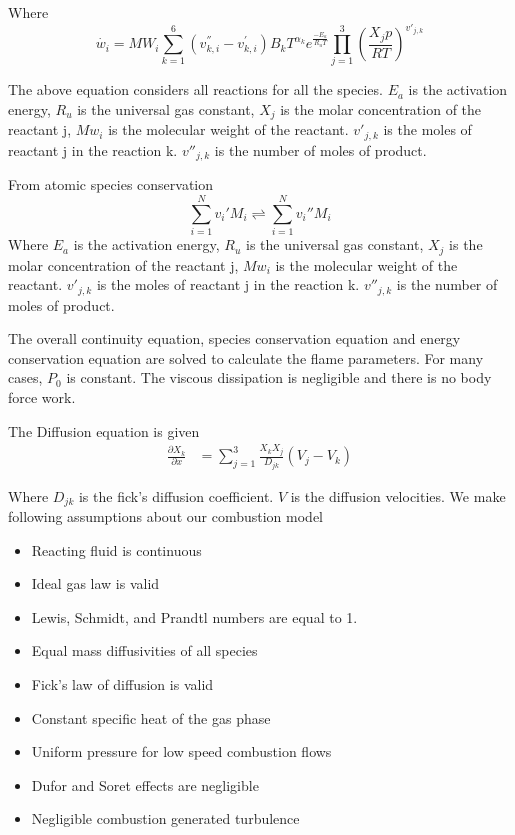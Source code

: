 Where $$\dot{w_i} = MW_i \sum_{k=1}^{6}(v_{k,i}^{''} - v_{k,i}^{'}) B_k T^{\alpha_k} e^{\frac{-E_a}{R_u T}} \prod_{j=1}^3 \left(\frac{X_j p}{R T} \right)^{v'_{j,k}}$$

\noindent The above equation considers all reactions for all the species. $E_a$ is the activation energy, $R_u$ is the universal gas constant, $X_j$ is the molar concentration of the reactant j, $Mw_i$ is the molecular weight of the reactant. $v'_{j,k}$ is the moles of reactant j in the reaction k. $v''_{j,k}$ is the number of moles of product. 

\noindent From atomic species conservation 
	$$\sum_{i=1}^{N} v_i{'}M_i \rightleftharpoons \sum_{i=1}^{N} v_i{''}M_i $$
\noindent Where $E_a$ is the activation energy, $R_u$ is the universal gas constant, $X_j$ is the molar concentration of the reactant j, $Mw_i$ is the molecular weight of the reactant. $v'_{j,k}$ is the moles of reactant j in the reaction k. $v''_{j,k}$ is the number of moles of product. 

\bigskip

\noindent The overall continuity equation, species conservation equation and energy conservation equation are solved to calculate the flame parameters. For many cases, $P_0$ is constant. The viscous dissipation is negligible and there is no body force work. 

\noindent The Diffusion equation is given 
\begin{eqnarray}
\frac{\partial X_k}{\partial x} &= \sum_{j=1}^{3} \frac{X_k X_j}{D_{jk}} (V_j - V_k)
\end{eqnarray}

\noindent Where $D_{jk}$ is the fick's diffusion coefficient. $V$ is the diffusion velocities. We make following assumptions about our combustion model 

\begin{itemize}
\item Reacting fluid is continuous
\item Ideal gas law is valid
\item Lewis, Schmidt, and Prandtl numbers are equal to 1. 
\item Equal mass diffusivities of all species
\item Fick's  law of diffusion is valid
\item Constant specific heat of the  gas phase
\item Uniform pressure for low speed combustion flows
\item Dufor and Soret effects are negligible
\item Negligible combustion generated turbulence
\end{itemize}


